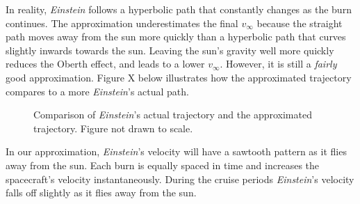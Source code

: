 \documentclass[12pt]{article} %
\begin{document}
In reality, \textit{Einstein} follows a hyperbolic path that constantly changes as the burn continues. The approximation underestimates the final $v_{\infty}$ because the straight path moves away from the sun more quickly than a hyperbolic path that curves slightly inwards towards the sun. Leaving the sun's gravity well more quickly reduces the Oberth effect, and leads to a lower $v_{\infty}$. However, it is still a \textit{fairly} good approximation. Figure X below illustrates how the approximated trajectory compares to a more \textit{Einstein}'s actual path.

\begin{figure}[H]
	\caption{Comparison of \textit{Einstein}'s actual trajectory and the approximated trajectory. Figure not drawn to scale.}
\end{figure}

In our approximation, \textit{Einstein}'s velocity will have a sawtooth pattern as it flies away from the sun. Each burn is equally spaced in time and increases the spacecraft's velocity instantaneously. During the cruise periods \textit{Einstein}'s velocity falls off slightly as it flies away from the sun.
\end{document}
